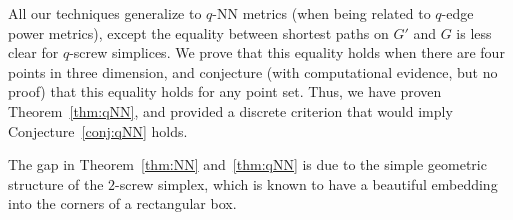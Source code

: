 All our techniques generalize to $q$-NN metrics (when being related to $q$-edge power
metrics), except the equality
between shortest paths on $G'$ and $G$ is less clear for $q$-screw
simplices. We prove that this equality holds when there are four points in
three dimension, and conjecture (with computational evidence, but no proof) that this
equality holds for any point set. Thus, we have proven
Theorem~\ref{thm:qNN}, and provided a discrete criterion that would imply
Conjecture~\ref{conj:qNN} holds.

The gap in Theorem~\ref{thm:NN} and~\ref{thm:qNN} is due to the simple
geometric structure of the $2$-screw simplex, which is known to have a
beautiful embedding into the corners of a rectangular box.






